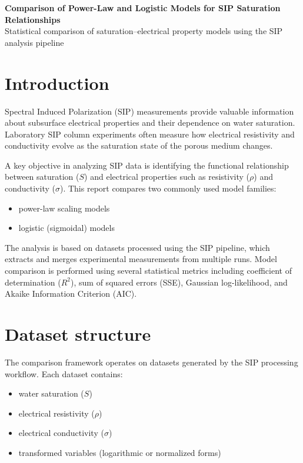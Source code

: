 \documentclass[11pt]{article}
\begin{document}
\begin{center}
{\LARGE\bfseries\color{accent} Comparison of Power-Law and Logistic Models for SIP Saturation Relationships}\\[0.4em]
{\large Statistical comparison of saturation--electrical property models using the SIP analysis pipeline}
\end{center}

\section{Introduction}

Spectral Induced Polarization (SIP) measurements provide valuable information about subsurface electrical properties and their dependence on water saturation. Laboratory SIP column experiments often measure how electrical resistivity and conductivity evolve as the saturation state of the porous medium changes.

A key objective in analyzing SIP data is identifying the functional relationship between saturation ($S$) and electrical properties such as resistivity ($\rho$) and conductivity ($\sigma$). This report compares two commonly used model families:

\begin{itemize}[leftmargin=1.5em]

\item power-law scaling models

\item logistic (sigmoidal) models

\end{itemize}

The analysis is based on datasets processed using the SIP pipeline, which extracts and merges experimental measurements from multiple runs. Model comparison is performed using several statistical metrics including coefficient of determination ($R^2$), sum of squared errors (SSE), Gaussian log-likelihood, and Akaike Information Criterion (AIC).

\section{Dataset structure}

The comparison framework operates on datasets generated by the SIP processing workflow. Each dataset contains:

\begin{itemize}[leftmargin=1.5em]

\item water saturation ($S$)

\item electrical resistivity ($\rho$)

\item electrical conductivity ($\sigma$)

\item transformed variables (logarithmic or normalized forms)

\end{itemize}
\end{document}
